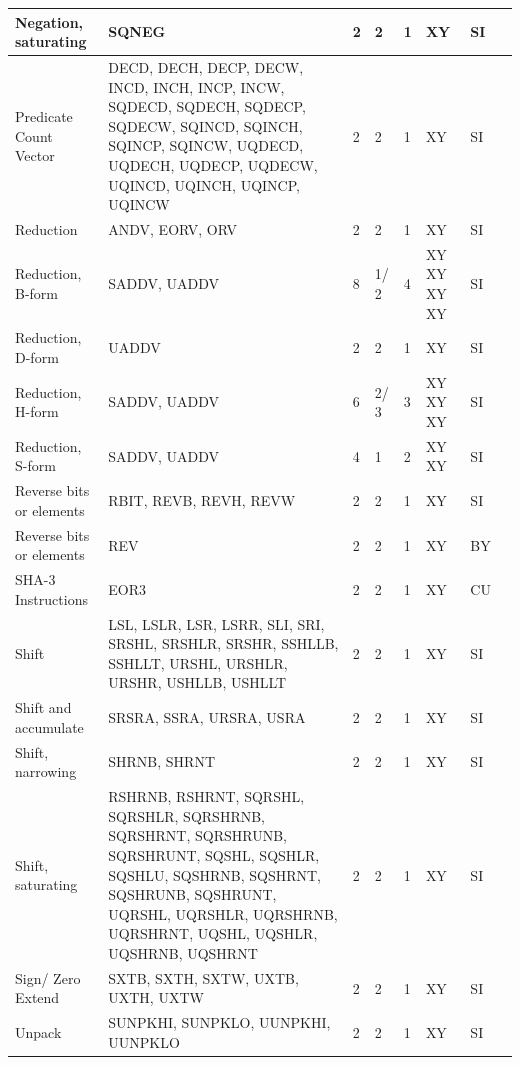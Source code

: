 \begin{longtable}{|p{1in}|p{1in}|l|l|l|p{1in}|l|p{1in}|}
\hline
Negation, saturating & SQNEG & 2 & 2 & 1 & XY & SI & \\
\hline
Predicate Count Vector & DECD, DECH, DECP, DECW, INCD, INCH, INCP, INCW, SQDECD, SQDECH, SQDECP, SQDECW, SQINCD, SQINCH, SQINCP, SQINCW, UQDECD, UQDECH, UQDECP, UQDECW, UQINCD, UQINCH, UQINCP, UQINCW & 2 & 2 & 1 & XY & SI & \\
\hline
Reduction & ANDV, EORV, ORV & 2 & 2 & 1 & XY & SI & \\
\hline
Reduction, B-form & SADDV, UADDV & 8 & 1/ 2 & 4 & XY XY XY XY & SI & \\
\hline
Reduction, D-form & UADDV & 2 & 2 & 1 & XY & SI & \\
\hline
Reduction, H-form & SADDV, UADDV & 6 & 2/ 3 & 3 & XY XY XY & SI & \\
\hline
Reduction, S-form & SADDV, UADDV & 4 & 1 & 2 & XY XY & SI & \\
\hline
Reverse bits or elements & RBIT, REVB, REVH, REVW & 2 & 2 & 1 & XY & SI & \\
\hline
Reverse bits or elements & REV & 2 & 2 & 1 & XY & BY & \\
\hline
SHA-3 Instructions & EOR3 & 2 & 2 & 1 & XY & CU & \\
\hline
Shift & LSL, LSLR, LSR, LSRR, SLI, SRI, SRSHL, SRSHLR, SRSHR, SSHLLB, SSHLLT, URSHL, URSHLR, URSHR, USHLLB, USHLLT & 2 & 2 & 1 & XY & SI & \\
\hline
Shift and accumulate & SRSRA, SSRA, URSRA, USRA & 2 & 2 & 1 & XY & SI & \\
\hline
Shift, narrowing & SHRNB, SHRNT & 2 & 2 & 1 & XY & SI & \\
\hline
Shift, saturating & RSHRNB, RSHRNT, SQRSHL, SQRSHLR, SQRSHRNB, SQRSHRNT, SQRSHRUNB, SQRSHRUNT, SQSHL, SQSHLR, SQSHLU, SQSHRNB, SQSHRNT, SQSHRUNB, SQSHRUNT, UQRSHL, UQRSHLR, UQRSHRNB, UQRSHRNT, UQSHL, UQSHLR, UQSHRNB, UQSHRNT & 2 & 2 & 1 & XY & SI & \\
\hline
Sign/ Zero Extend & SXTB, SXTH, SXTW, UXTB, UXTH, UXTW & 2 & 2 & 1 & XY & SI & \\
\hline
Unpack & SUNPKHI, SUNPKLO, UUNPKHI, UUNPKLO & 2 & 2 & 1 & XY & SI & \\
\hline
\end{longtable}
\newpage
